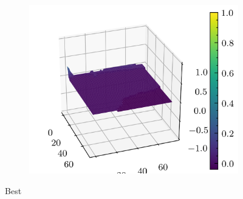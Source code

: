 \documentclass[../document.tex]{subfiles}
\begin{document}
\begin{figure}[H]
\begin{subfigure}[b]{0.19\textwidth}
        \includegraphics[width=\linewidth]{../img/5/quarry/best/patch-3d-4.png}
    \end{subfigure}  

\caption{Best}    
\end{figure}
\end{document}
